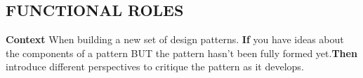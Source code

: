 \subsection*{FUNCTIONAL ROLES {\hfill \motor}}

\textbf{Context} When building a new set of design patterns.\newline
\textbf{If} you have ideas about the components of a pattern BUT the
pattern hasn’t been fully formed yet.\newline \textbf{Then} introduce
different perspectives to critique the pattern as it
develops.
